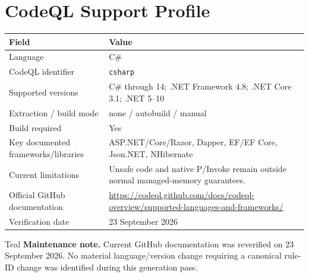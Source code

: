 \documentclass[10pt,letterpaper]{article}
\newcommand{\code}[1]{\texttt{\small #1}}
\begin{document}
\section{CodeQL Support Profile}
\begin{tabularx}{\textwidth}{@{}P{1.9in}Y@{}}
\toprule
\textbf{Field} & \textbf{Value}\\
\midrule
Language & C\#\\
CodeQL identifier & \code{csharp}\\
Supported versions & C\# through 14; .NET Framework 4.8; .NET Core 3.1; .NET 5--10\\
Extraction / build mode & none / autobuild / manual\\
Build required & Yes\\
Key documented frameworks/libraries & ASP.NET/Core/Razor, Dapper, EF/EF Core, Json.NET, NHibernate\\
Current limitations & Unsafe code and native P/Invoke remain outside normal managed-memory guarantees.\\
Official GitHub documentation & \url{https://codeql.github.com/docs/codeql-overview/supported-languages-and-frameworks/}\\
Verification date & 23 September 2026\\
\bottomrule
\end{tabularx}
\begin{callout}{Teal}
\textbf{Maintenance note.} Current GitHub documentation was reverified on 23 September 2026. No material language/version change requiring a canonical rule-ID change was identified during this generation pass.
\end{callout}
\end{document}
